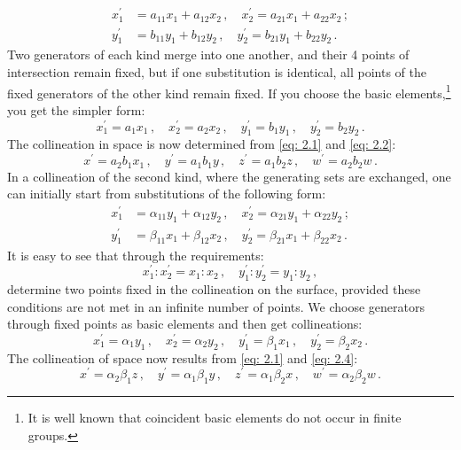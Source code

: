 \documentclass[leqno]{article}
\begin{document}
\begin{align*}
	x_1^\prime &= a_{11} x_1 + a_{12} x_2 \, , \quad x_2^\prime = a_{21} x_1 + a_{22} x_2 \, ; \\
	y_1^\prime &= b_{11} y_1 + b_{12} y_2 \, , \quad y_2^\prime = b_{21} y_1 + b_{22} y_2 \, . 
\end{align*}
Two generators of each kind merge into one another, and their 4 points of intersection remain fixed, but if one substitution is identical, all points of the fixed generators of the other kind remain fixed. If you choose the basic elements,\footnote{It is well known that coincident basic elements do not occur in finite groups.} you get the simpler form:
\begin{equation}\label{eq: 2.2}
x_1^\prime = a_1 x_1 \, , \quad x_2^\prime = a_2 x_2 \, , \quad y_1^\prime = b_1 y_1 \, , \quad y_2^\prime = b_2 y_2 \, . \tag{2}
\end{equation}
The collineation in space is now determined from \eqref{eq: 2.1} and \eqref{eq: 2.2}:
\begin{equation}\label{eq: 2.3}
x^\prime = a_2 b_1 x_1 \, , \quad y^\prime = a_1 b_1 y \, , \quad z^\prime = a_1 b_2 z \, , \quad w^\prime = a_2 b_2 w \, . \tag{3}
\end{equation}
In a collineation of the second kind, where the generating sets are exchanged, one can initially start from substitutions of the following form:
\begin{align*}
	x_1^\prime &= \alpha_{11} y_1 + \alpha_{12} y_2 \, , \quad x_2^\prime = \alpha_{21} y_1 + \alpha_{22} y_2 \, ; \\
	y_1^\prime &= \beta_{11} x_1 + \beta_{12} x_2 \, , \quad y_2^\prime = \beta_{21} x_1 + \beta_{22} x_2 \, . 
\end{align*}
It is easy to see that through the requirements:
\[
x_1^\prime : x_2^\prime = x_1 : x_2 \, , \quad y_1^\prime: y_2^\prime = y_1 : y_2 \, , 
\]
determine two points fixed in the collineation on the surface, provided these conditions are not met in an infinite number of points. We choose generators through fixed points as basic elements and then get collineations: 
\begin{equation}\label{eq: 2.4}
x_1^\prime = \alpha_1 y_1 \, , \quad x_2^\prime = \alpha_2 y_2 \, , \quad y_1^\prime = \beta_1 x_1 \, , \quad y_2^\prime = \beta_2 x_2 \, . \tag{4}
\end{equation}
The collineation of space now results from \eqref{eq: 2.1} and \eqref{eq: 2.4}: 
\begin{equation}\label{eq: 2.5}
x^\prime = \alpha_2 \beta_1 z \, , \quad y^\prime = \alpha_1 \beta_1 y \, , \quad z^\prime = \alpha_1 \beta_2 x \, , \quad w^\prime = \alpha_2 \beta_2 w \, . \tag{5}
\end{equation}
\end{document}
